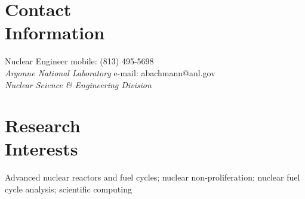 \documentclass[margin,line]{resume}
\begin{document}
\begin{resume}



    \section{\mysidestyle Contact\\Information}
    Nuclear Engineer \hfill mobile: (813) 495-5698 \vspace{0mm}\\\vspace{0mm}%
    \textsl{Argonne National Laboratory} \hfill e-mail: abachmann@anl.gov \vspace{0mm}\\\vspace{0mm}%
        \textsl{Nuclear Science \& Engineering Division}
    \vspace{0mm}\\\vspace{-4.5mm}%

    \section{\mysidestyle Research\\Interests}
                Advanced nuclear reactors and fuel cycles; 
                nuclear non-proliferation;
                nuclear fuel cycle analysis;
                scientific computing

\end{resume}
\end{document}
